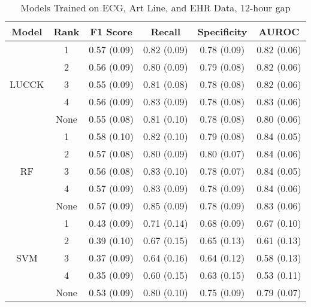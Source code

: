 \begin{table}
    \centering
    \caption{Models Trained on ECG, Art Line, and EHR Data, 12-hour gap}
    \begin{tabularx}{\textwidth}{|c|c|C|C|C|C|}
        \hline
        Model & Rank & F1 Score & Recall & Specificity & AUROC \\
        \hline
        & 1 & 0.57 (0.09) & 0.82 (0.09) & 0.78 (0.09) & 0.82 (0.06)\\
        & 2 & 0.56 (0.09) & 0.80 (0.09) & 0.79 (0.08) & 0.82 (0.06)\\
        LUCCK & 3 & 0.55 (0.09) & 0.81 (0.08) & 0.78 (0.08) & 0.82 (0.06)\\
        & 4 & 0.56 (0.09) & 0.83 (0.09) & 0.78 (0.08) & 0.83 (0.06)\\
        & None & 0.55 (0.08) & 0.81 (0.10) & 0.78 (0.08) & 0.80 (0.06)\\
        \hline                
        & 1 & 0.58 (0.10) & 0.82 (0.10) & 0.79 (0.08) & 0.84 (0.05)\\
        & 2 & 0.57 (0.08) & 0.80 (0.09) & 0.80 (0.07) & 0.84 (0.06)\\
        RF & 3 & 0.56 (0.08) & 0.83 (0.10) & 0.78 (0.07) & 0.84 (0.05)\\
        & 4 & 0.57 (0.09) & 0.83 (0.09) & 0.78 (0.09) & 0.84 (0.06)\\
        & None & 0.57 (0.09) & 0.85 (0.09) & 0.78 (0.09) & 0.83 (0.06)\\
        \hline
        & 1 & 0.43 (0.09) & 0.71 (0.14) & 0.68 (0.09) & 0.67 (0.10)\\
        & 2 & 0.39 (0.10) & 0.67 (0.15) & 0.65 (0.13) & 0.61 (0.13)\\
        SVM & 3 & 0.37 (0.09) & 0.64 (0.16) & 0.64 (0.12) & 0.58 (0.13)\\
        & 4 & 0.35 (0.09) & 0.60 (0.15) & 0.63 (0.15) & 0.53 (0.11)\\
        & None & 0.53 (0.09) & 0.80 (0.10) & 0.75 (0.09) & 0.79 (0.07)\\
        \hline
    \end{tabularx} 
\end{table}

\clearpage